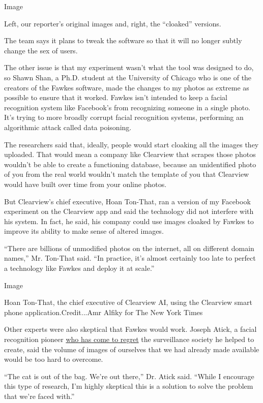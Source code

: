 Image

Left, our reporter's original images and, right, the ``cloaked''
versions.

The team says it plans to tweak the software so that it will no longer
subtly change the sex of users.

The other issue is that my experiment wasn't what the tool was designed
to do, so Shawn Shan, a Ph.D. student at the University of Chicago who
is one of the creators of the Fawkes software, made the changes to my
photos as extreme as possible to ensure that it worked. Fawkes isn't
intended to keep a facial recognition system like Facebook's from
recognizing someone in a single photo. It's trying to more broadly
corrupt facial recognition systems, performing an algorithmic attack
called data poisoning.

The researchers said that, ideally, people would start cloaking all the
images they uploaded. That would mean a company like Clearview that
scrapes those photos wouldn't be able to create a functioning database,
because an unidentified photo of you from the real world wouldn't match
the template of you that Clearview would have built over time from your
online photos.

But Clearview's chief executive, Hoan Ton-That, ran a version of my
Facebook experiment on the Clearview app and said the technology did not
interfere with his system. In fact, he said, his company could use
images cloaked by Fawkes to improve its ability to make sense of altered
images.

``There are billions of unmodified photos on the internet, all on
different domain names,'' Mr. Ton-That said. ``In practice, it's almost
certainly too late to perfect a technology like Fawkes and deploy it at
scale.''

Image

Hoan Ton-That, the chief executive of Clearview AI, using the Clearview
smart phone application.Credit...Amr Alfiky for The New York Times

Other experts were also skeptical that Fawkes would work. Joseph Atick,
a facial recognition pioneer
\href{https://www.nytimes.com/2014/05/18/technology/never-forgetting-a-face.html}{who
has come to regret} the surveillance society he helped to create, said
the volume of images of ourselves that we had already made available
would be too hard to overcome.

``The cat is out of the bag. We're out there,'' Dr. Atick said. ``While
I encourage this type of research, I'm highly skeptical this is a
solution to solve the problem that we're faced with.''

